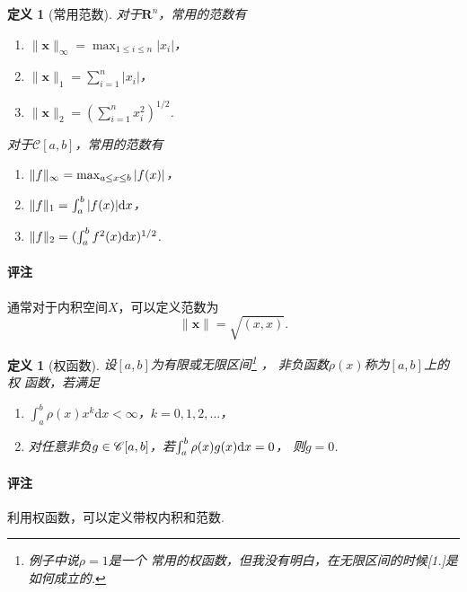 \documentclass[12pt, a4paper]{article}
\theoremstyle{margin}
\newtheorem{defi}[thm]{定义}
\newcommand{\ms}{\mathscr}
\newcommand{\tbf}{\textbf}
\newcommand{\f}{\mathnormal{f}}
\newcommand{\g}{\mathnormal{g}}
\newcommand{\R}{\mathbf{R}}
\newcommand{\rd}{\mathrm{d}}
\newcommand{\remark}{\paragraph{评注}}
\begin{document}
  \begin{defi}[常用范数]
    对于$\R^n$，常用的范数有
    \begin{enumerate}
      \item $\|\tbf{x}\|_\infty = \max_{1\le i\le n}|x_i|$，
      \item $\|\tbf{x}\|_1 = \sum_{i=1}^n|x_i|$，
      \item $\|\tbf{x}\|_2 = (\sum_{i=1}^nx_i^2)^{1/2}$.
    \end{enumerate}
    对于$\ms{C}[a, b]$，常用的范数有
    \begin{enumerate}
      \item $\|\f\|_\infty = \max_{a\le x\le b}|\f(x)|$，
      \item $\|\f\|_1 = \int_a^b|\f(x)|\rd x$，
      \item $\|\f\|_2 = (\int_a^b\f^2(x) \rd x)^{1/2}$.
    \end{enumerate}
  \end{defi}
  \remark
    通常对于内积空间$X$，可以定义范数为
    \[
      \|\tbf{x}\| = \sqrt{(x, x)}.
    \]

  \begin{defi}[权函数]
    \label{defi: 权函数}
    设$[a,b]$为有限或无限区间\footnote{例子中说$\rho=1$是一个
    常用的权函数，但我没有明白，在无限区间的时候[1.]是如何成立的. }
    ，
    非负函数$\rho(x)$称为$[a,b]$上的权
    函数，若满足
    \begin{enumerate}
      \item $\int_a^b\rho(x)x^k\rd x < \infty$，$k=0,1,2,\dots$，
      \item 对任意非负$\g\in\ms{C}[a, b]$，若$\int_a^b\rho(x)\g(x)\rd x =0$，
      则$g=0$.
    \end{enumerate}
  \end{defi}
  \remark
    利用权函数，可以定义带权内积和范数.

\newpage
\end{document}

